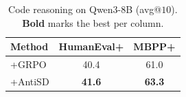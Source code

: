 \begin{table}
  \vspace{-1.5em}
  \centering
  \small
  \setlength{\tabcolsep}{6pt}
  \renewcommand{\arraystretch}{0.95}
  \caption{{Code reasoning on Qwen3-8B} (avg@$10$). \textbf{Bold} marks the best per column.}
  \label{tab:code}
  \begin{tabular}{l|cc}
    \toprule
    \textbf{Method}              & \textbf{HumanEval+} & \textbf{MBPP+} \\
    \midrule
    +GRPO                        & 40.4                & 61.0           \\
    \rowcolor{antisdrow} +AntiSD & \textbf{41.6}       & \textbf{63.3}  \\
    \bottomrule
  \end{tabular}
  \vspace{-1.0em}
\end{table}
